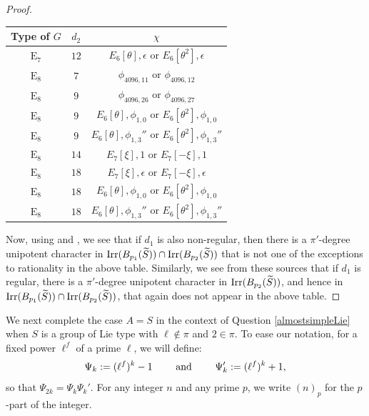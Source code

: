 \documentclass[12pt,leqno,a4paper]{amsart}
\def\irr#1{{\rm Irr}(#1)}
\theoremstyle{remark}
\newcommand\wt[1]{\widetilde{#1}}
\newcommand\type[1]{\operatorname{#1}}
\begin{document}
\begin{proof}
\begin{center}
\tiny
\begin{tabular}{|c|c|c|}
\hline
Type of $G$ & $d_2$ & $\chi$\\
\hline
 $\type{E}_7$ & $12$ & $E_6[\theta],\epsilon$ or $E_6[\theta^2],{\epsilon}$ \\
 \hline  
  $\type{E}_8$ & $7$ & $\phi_{4096,11}$ or $\phi_{4096, 12}$ \\
  \hline
  $\type{E}_8$ & $9$ & $\phi_{4096,26}$ or $\phi_{4096, 27}$ \\
  \hline
  $\type{E}_8$ & $9$ & $E_6[\theta],\phi_{1,0}$ or $E_6[\theta^2],\phi_{1,0}$\\
   \hline
   $\type{E}_8$ & $9$ & $E_6[\theta],\phi_{1,3}''$ or $E_6[\theta^2],\phi_{1,3}''$\\
   \hline
   $\type{E}_8$ & $14$ & $E_7[\xi],1$ or $E_7[-\xi],1$\\
   \hline
   $\type{E}_8$ & $18$ & $E_7[\xi],\epsilon$ or $E_7[-\xi],\epsilon$\\
   \hline
   $\type{E}_8$ & $18$ & $E_6[\theta],\phi_{1,0}$ or $E_6[\theta^2],\phi_{1,0}$\\
   \hline
  $\type{E}_8$ & $18$ & $E_6[\theta],\phi_{1,3}''$ or $E_6[\theta^2],\phi_{1,3}''$\\
 \hline
  \end{tabular} 
  \end{center}
  
  \normalsize

Now, using \cite[Section 13.9]{carter} and \cite[Tables 1 \& 2]{BMM93}, we see that
if $d_1$ is also non-regular, then there is a $\pi'$-degree unipotent character in $\irr{B_{p_1}(\wt{S})} \cap  \irr{B_{p_2}(\wt{S})}$ that is not one of the exceptions to rationality in the above table.  Similarly, we see from these sources that if $d_1$ is regular, there is a $\pi'$-degree unipotent character in $\irr{B_{p_2}(\wt{S})}$, and hence in $\irr{B_{p_1}(\wt{S})} \cap  \irr{B_{p_2}(\wt{S})}$, that again does not appear in the above table. 
\end{proof}

We next complete the case $A=S$ in the context of Question \ref{almostsimpleLie} when $S$ is a group of Lie type with $\ell\not\in\pi$ and $2\in\pi$.  To ease our notation, for a fixed power $\ell^f$ of a prime $\ell$, we will define:
\[\Psi_{k}:=(\ell^f)^k-1 \quad\quad\hbox{ and }\quad\quad \Psi_{k}':=(\ell^f)^k+1,\]  so that $\Psi_{2k}=\Psi_k\Psi_k'$.  For any integer $n$ and any prime $p$, we write $(n)_p$  for the $p$-part of the integer.
 
\end{document}
